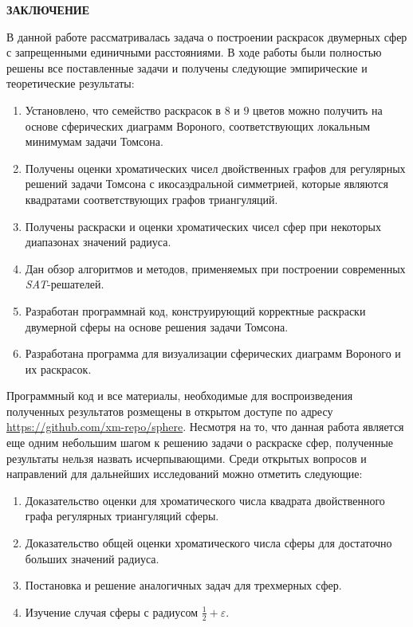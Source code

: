\newpage
\begin{center}
\noindent\textbf{ЗАКЛЮЧЕНИЕ}\label{chapters:conclusions}
\vspace{1.5mm}
\end{center}

В данной работе рассматривалась задача о построении раскрасок двумерных сфер с запрещенными единичными расстояниями. 
В ходе работы были полностью решены все поставленные задачи и получены следующие эмпирические и теоретические результаты:

\begin{enumerate}

\item Установлено, что семейство раскрасок в $8$ и $9$ цветов можно получить на основе сферических диаграмм Вороного, соответствующих локальным минимумам задачи Томсона.  

\item Получены оценки хроматических чисел двойственных графов для регулярных решений задачи Томсона с икосаэдральной симметрией, которые являются квадратами соответствующих графов триангуляций.

\item Получены раскраски и оценки хроматических чисел сфер при некоторых диапазонах значений радиуса.

\item Дан обзор алгоритмов и методов, применяемых при построении современных \textit{SAT}-решателей.

\item Разработан программнай код, конструирующий корректные раскраски двумерной сферы на основе решения задачи Томсона.

\item Разработана программа для визуализации сферических диаграмм Вороного и их раскрасок.

\end{enumerate}

Программный код и все материалы, необходимые для воспроизведения полученных результатов розмещены в открытом доступе по адресу
\url{https://github.com/xm-repo/sphere}.
Несмотря на то, что данная работа является еще одним небольшим шагом к решению задачи о раскраске сфер, полученные результаты нельзя назвать исчерпывающими. Среди открытых вопросов и направлений для дальнейших исследований можно отметить следующие:

\begin{enumerate}

\item Доказательство оценки для хроматического числа квадрата двойственного графа регулярных триангуляций сферы.
\item Доказательство общей оценки хроматического числа сферы для достаточно больших значений радиуса.
\item Постановка и решение аналогичных задач для трехмерных сфер.
\item Изучение случая сферы с радиусом $\frac{1}{2}+\varepsilon$.

\end{enumerate}

